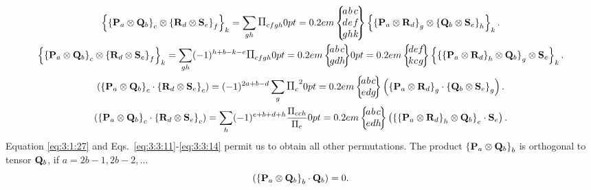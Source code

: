 \begin{gather}
\left\{\left\{\vect{P}_{a} \otimes \vect{Q}_{b}\right\}_{c} \otimes\left\{\vect{R}_{d} \otimes \vect{S}_{e}\right\}_{f}\right\}_{k}=\sum_{g h} \Fact{c f g h}
\ninej{a }{ b }{ c }{d }{ e }{ f }{g }{ h }{ k}\left\{\left\{\vect{P}_{a} \otimes \vect{R}_{d}\right\}_{g} \otimes\left\{\vect{Q}_{b} \otimes \vect{S}_{e}\right\}_{h}\right\}_{k} . \label{eq:3:3:11}\\
\left\{\left\{\vect{P}_{a} \otimes \vect{Q}_{b}\right\}_{c} \otimes\left\{\vect{R}_{d} \otimes \vect{S}_{e}\right\}_{f}\right\}_{k}=\sum_{g h}(-1)^{h+b-k-e} \Fact{c f g h}\sixj{a }{ b }{ c }{g }{ d }{ h}\sixj{d }{ e }{ f }{k }{ c }{ g}\left\{\left\{\left\{\vect{P}_{a} \otimes \vect{R}_{d}\right\}_{h} \otimes \vect{Q}_{b}\right\}_{g} \otimes \vect{S}_{e}\right\}_{k} . \label{eq:3:3:12}\\
\left(\left\{\vect{P}_{a} \otimes \vect{Q}_{b}\right\}_{c} \cdot\left\{\vect{R}_{d} \otimes \vect{S}_{e}\right\}_{c}\right)=(-1)^{2 a+b-d} \sum_{g} \Fact{c}^{2}\sixj{a }{ b }{ c }{e }{ d }{ g}\left(\left\{\vect{P}_{a} \otimes \vect{R}_{d}\right\}_{g} \cdot\left\{\vect{Q}_{b} \otimes \vect{S}_{e}\right\}_{g}\right) . \label{eq:3:3:13}\\
\left(\left\{\vect{P}_{a} \otimes \vect{Q}_{b}\right\}_{c} \cdot\left\{\vect{R}_{d} \otimes \vect{S}_{e}\right\}_{c}\right)=\sum_{h}(-1)^{e+b+d+h} \frac{\Fact{c c h}}{\Fact{e}}\sixj{a }{ b }{ c }{e }{ d }{ h}\left(\left\{\left\{\vect{P}_{a} \otimes \vect{R}_{d}\right\}_{h} \otimes \vect{Q}_{b}\right\}_{e} \cdot \vect{S}_{e}\right). \label{eq:3:3:14}
\end{gather}
Equation \eqref{eq:3:1:27} and Eqs.~\eqref{eq:3:3:11}-\eqref{eq:3:3:14} permit us to obtain all other permutations. The product $\left\{\mathbf{P}_{a} \otimes \mathbf{Q}_{b}\right\}_{b}$ is orthogonal to tensor $\mathbf{Q}_{b}$, if $a=2 b-1,2 b-2, \ldots$
\begin{equation}
\left(\left\{\mathbf{P}_{a} \otimes \mathbf{Q}_{b}\right\}_{b} \cdot \mathbf{Q}_{b}\right)=0 .\label{eq:3:3:15}
\end{equation}
